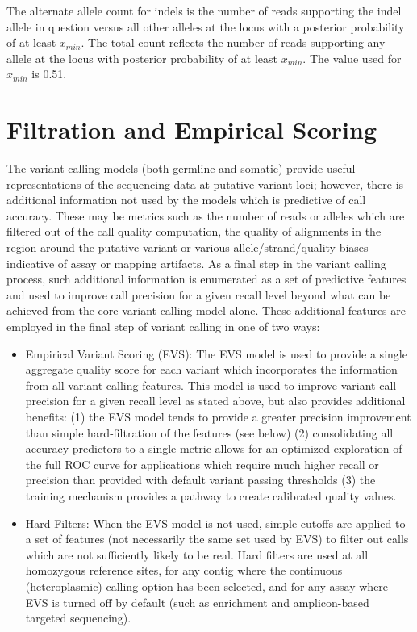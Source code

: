 \documentclass{article}
\begin{document}
The alternate allele count for indels is the number of reads supporting the indel allele in question versus all other alleles at the locus with a posterior probability of at least $x_{min}$. The total count reflects the number of reads supporting any allele at the locus with posterior probability of at least $x_{min}$. The value used for $x_{min}$ is 0.51.

\section{Filtration and Empirical Scoring}

The variant calling models (both germline and somatic) provide useful representations of the sequencing data at putative variant loci; however, there is additional information not used by the models which is predictive of call accuracy. These may be metrics such as the number of reads or alleles which are filtered out of the call quality computation, the quality of alignments in the region around the putative variant or various allele/strand/quality biases indicative of assay or mapping artifacts. As a final step in the variant calling process, such additional information is enumerated as a set of predictive features and used to improve call precision for a given recall level beyond what can be achieved from the core variant calling model alone. These additional features are employed in the final step of variant calling in one of two ways:

\begin{itemize}
    \item Empirical Variant Scoring (EVS):
    The EVS model is used to provide a single aggregate quality score for each variant which incorporates the information from all variant calling features. This model is used to improve variant call precision for a given recall level as stated above, but also provides additional benefits: (1) the EVS model tends to provide a greater precision improvement than simple hard-filtration of the features (see below) (2) consolidating all accuracy predictors to a single metric allows for an optimized exploration of the full ROC curve for applications which require much higher recall or precision than provided with default variant passing thresholds (3) the training mechanism provides a pathway to create calibrated quality values.
    \item Hard Filters:
    When the EVS model is not used, simple cutoffs are applied to a set of features (not necessarily the same set used by EVS) to filter out calls which are not sufficiently likely to be real. Hard filters are used at all homozygous reference sites, for any contig where the continuous (heteroplasmic) calling option has been selected, and for any assay where EVS is turned off by default (such as enrichment and amplicon-based targeted sequencing).
\end{itemize}
\end{document}
